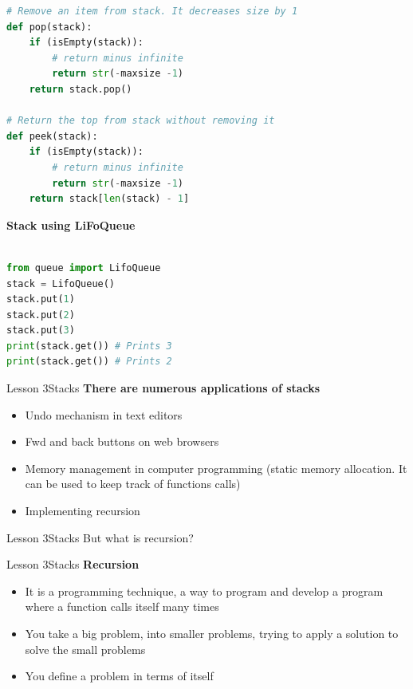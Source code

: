 \documentclass[aspectratio=1610]{beamer}
\begin{document}
    
\begin{frame}[fragile]
\Large
\begin{lstlisting}[language=Python]    
# Remove an item from stack. It decreases size by 1 
def pop(stack): 
    if (isEmpty(stack)): 
        # return minus infinite
        return str(-maxsize -1) 
    return stack.pop() 

# Return the top from stack without removing it 
def peek(stack): 
    if (isEmpty(stack)): 
        # return minus infinite
        return str(-maxsize -1)  
    return stack[len(stack) - 1] 
 \end{lstlisting}
\end{frame}


\begin{frame}[fragile]
\LARGE
\textbf{Stack using LiFoQueue}\\~\\
\Large
\begin{lstlisting}[language=Python]
from queue import LifoQueue
stack = LifoQueue()
stack.put(1)
stack.put(2)
stack.put(3)
print(stack.get()) # Prints 3
print(stack.get()) # Prints 2
\end{lstlisting}
\end{frame}



\begin{frame}{Lesson 3}{Stacks}
\LARGE
\textbf{There are numerous applications of stacks}\\
\begin{itemize}
    \item Undo mechanism in text editors
    \item Fwd and back buttons on web browsers
    \item Memory management in computer programming (static memory allocation. It can be used to keep track of functions calls)
    \item Implementing \alert{recursion}
\end{itemize}
\end{frame}



\begin{frame}{Lesson 3}{Stacks}
\Huge
 But what is recursion?
\end{frame}


\begin{frame}{Lesson 3}{Stacks}
\LARGE
\textbf{Recursion}\\
\begin{itemize}
    \item It is a programming technique, a way to program and develop a program where a function calls itself many times
    \item You take a big problem, into smaller problems, trying to apply a solution to solve the small problems
    \item You define a problem in terms of itself 
\end{itemize}
\end{frame}
\end{document}
